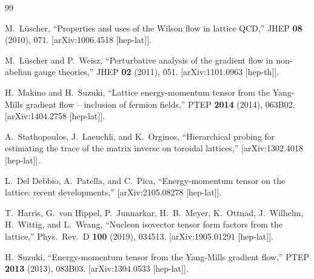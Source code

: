 \documentclass[11pt,a4paper]{article}
\begin{document}
\begin{thebibliography}{99}

M.\ L\"uscher,
``Properties and uses of the Wilson flow in lattice QCD,''
JHEP \textbf{08} (2010), 071.
[arXiv:1006.4518 [hep-lat]].

M.\ L\"uscher and P.\ Weisz,
``Perturbative analysis of the gradient flow in non-abelian gauge theories,''
JHEP \textbf{02} (2011), 051.
[arXiv:1101.0963 [hep-th]].

H.\ Makino and H.\ Suzuki,
``Lattice energy-momentum tensor from the Yang-Mills gradient flow
-- inclusion of fermion fields,''
PTEP \textbf{2014} (2014), 063B02.
[arXiv:1404.2758 [hep-lat]].

A.\ Stathopoulos, J.\ Laeuchli, and K.\ Orginos,
``Hierarchical probing for estimating the trace of the matrix inverse on
toroidal lattices,''
[arXiv:1302.4018 [hep-lat]].

L.\ Del Debbio, A.\ Patella, and C.\ Pica,
``Energy-momentum tensor on the lattice: recent developments,''
[arXiv:2105.08278 [hep-lat]].

T.\ Harris, G.\ von Hippel, P.\ Junnarkar, H.\ B.\ Meyer, K.\ Ottnad,
J.\ Wilhelm, H.\ Wittig, and L.\ Wrang,
``Nucleon isovector tensor form factors from the lattice,''
Phys.\ Rev.\ D \textbf{100} (2019), 034513.
[arXiv:1905.01291 [hep-lat]].

H.\ Suzuki,
``Energy-momentum tensor from the Yang-Mills gradient flow,''
PTEP \textbf{2013} (2013), 083B03.
[arXiv:1304.0533 [hep-lat]].

\end{thebibliography}
\end{document}
